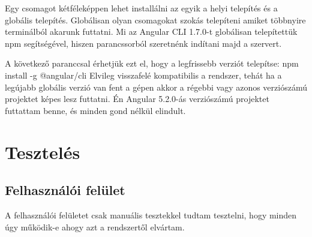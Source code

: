 Egy csomagot kétféleképpen lehet installálni az egyik a helyi telepítés és a globális telepítés. Globálisan olyan csomagokat szokás telepíteni amiket többnyire terminálból akarunk futtatni.
Mi az Angular CLI 1.7.0-t globálisan telepítettük npm segítségével, hiszen parancssorból szeretnénk indítani majd a szervert.

A következő paranccsal érhetjük ezt el, hogy a legfrissebb verziót telepítse: npm install -g @angular/cli
Elvileg visszafelé kompatibilis a rendszer, tehát ha a legújabb globális verzió van fent a gépen akkor a régebbi vagy azonos verziószámú projektet képes lesz futtatni. Én Angular 5.2.0-ás verziószámú projektet futtattam benne, és minden gond nélkül elindult.

\section{Tesztelés}

\subsection{Felhasználói felület}
A felhasználói felületet csak manuális tesztekkel tudtam tesztelni, hogy minden úgy működik-e ahogy azt a rendszertől elvártam.
